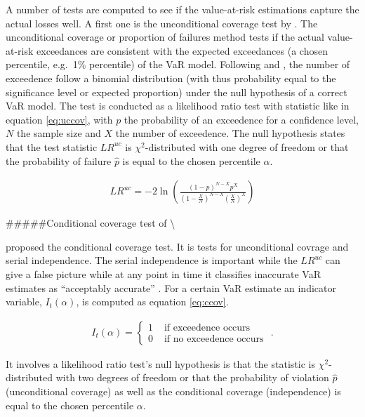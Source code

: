 \documentclass[a4paper, twoside]{templates/ociamthesis}
\begin{document}
A number of tests are computed to see if the value-at-risk estimations capture the actual losses well. A first one is the unconditional coverage test by \textcite{kupiec1995}. The unconditional coverage or proportion of failures method tests if the actual value-at-risk exceedances are consistent with the expected exceedances (a chosen percentile, e.g.~1\% percentile) of the VaR model. Following \textcite{kupiec1995} and \textcite{ghalanos2020}, the number of exceedence follow a binomial distribution (with thus probability equal to the significance level or expected proportion) under the null hypothesis of a correct VaR model. The test is conducted as a likelihood ratio test with statistic like in equation \eqref{eq:uccov}, with \(p\) the probability of an exceedence for a confidence level, \(N\) the sample size and \(X\) the number of exceedence. The null hypothesis states that the test statistic \(L R^{u c}\) is \(\chi^2\)-distributed with one degree of freedom or that the probability of failure \(\hat p\) is equal to the chosen percentile \(\alpha\).

\begin{align}
L R^{u c}=-2 \ln \left(\frac{(1-p)^{N-X} p^{X}}{\left(1-\frac{X}{N}\right)^{N-X}\left(\frac{X}{N}\right)^{X}}\right)
\label{eq:uccov}
\end{align}

\#\#\#\#\#Conditional coverage test of \textcite{christoffersen2001} \textbackslash{}

\textcite{christoffersen2001} proposed the conditional coverage test. It is tests for unconditional covrage and serial independence. The serial independence is important while the \(L R^{u c}\) can give a false picture while at any point in time it classifies inaccurate VaR estimates as ``acceptably accurate'' \autocite{bali2007}. For a certain VaR estimate an indicator variable, \(I_t(\alpha)\), is computed as equation \eqref{eq:ccov}.

\begin{align}
I_{t}(\alpha)=\left\{\begin{array}{ll}
1 & \text { if exceedence occurs } \\
0 & \text { if no exceedence occurs }
\end{array} .\right.
\label{eq:ccov}
\end{align}

It involves a likelihood ratio test's null hypothesis is that the statistic is \(\chi^2\)-distributed with two degrees of freedom or that the probability of violation \(\hat p\) (unconditional coverage) as well as the conditional coverage (independence) is equal to the chosen percentile \(\alpha\).
\end{document}
